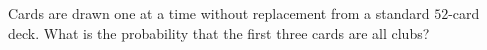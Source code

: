 Cards are drawn one at a time without replacement from a standard $52$-card deck. What is the probability that the first three cards are all clubs?
